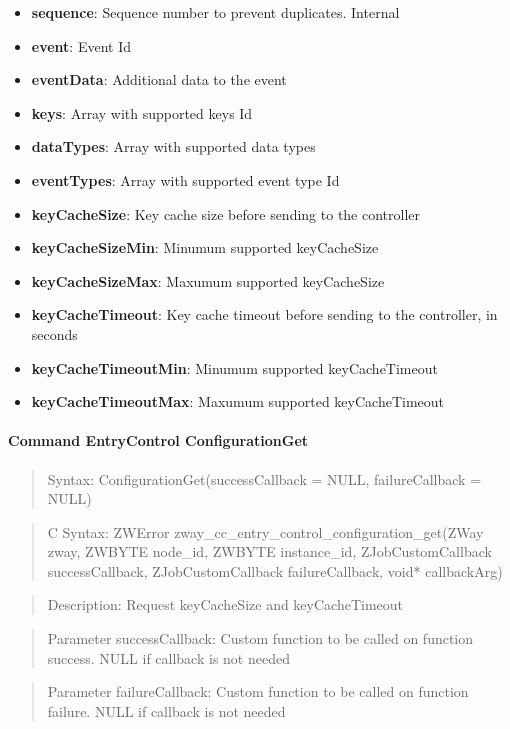 \begin{itemize}
\item \textbf{sequence}: Sequence number to prevent duplicates. Internal
\item \textbf{event}: Event Id
\item \textbf{eventData}: Additional data to the event
\item \textbf{keys}: Array with supported keys Id
\item \textbf{dataTypes}: Array with supported data types
\item \textbf{eventTypes}: Array with supported event type Id
\item \textbf{keyCacheSize}: Key cache size before sending to the controller
\item \textbf{keyCacheSizeMin}: Minumum supported keyCacheSize
\item \textbf{keyCacheSizeMax}: Maxumum supported keyCacheSize
\item \textbf{keyCacheTimeout}: Key cache timeout before sending to the controller, in seconds
\item \textbf{keyCacheTimeoutMin}: Minumum supported keyCacheTimeout
\item \textbf{keyCacheTimeoutMax}: Maxumum supported keyCacheTimeout
\end{itemize}

\paragraph{Command EntryControl ConfigurationGet}
\begin{quote}Syntax: ConfigurationGet(successCallback = NULL, failureCallback = NULL)\end{quote}
\begin{quote}C Syntax: ZWError zway\_cc\_entry\_control\_configuration\_get(ZWay zway, ZWBYTE node\_id, ZWBYTE instance\_id, ZJobCustomCallback successCallback, ZJobCustomCallback failureCallback, void* callbackArg)\end{quote}
\begin{quote}Description: Request keyCacheSize and keyCacheTimeout\end{quote}
\begin{quote}Parameter successCallback: Custom function to be called on function success. NULL if callback is not needed\end{quote}
\begin{quote}Parameter failureCallback: Custom function to be called on function failure. NULL if callback is not needed\end{quote}


